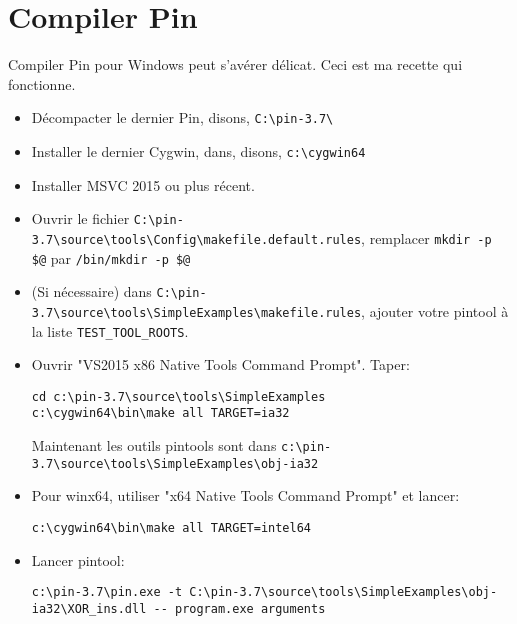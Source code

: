 \section{Compiler Pin}

Compiler Pin pour Windows peut s'avérer délicat.
Ceci est ma recette qui fonctionne.

\begin{itemize}

\item Décompacter le dernier Pin, disons, \verb|C:\pin-3.7\|

\item Installer le dernier Cygwin, dans, disons, \verb|c:\cygwin64|

\item Installer MSVC 2015 ou plus récent.

\item Ouvrir le fichier \verb|C:\pin-3.7\source\tools\Config\makefile.default.rules|, remplacer \verb|mkdir -p $@| par \verb|/bin/mkdir -p $@|

\item (Si nécessaire) dans \verb|C:\pin-3.7\source\tools\SimpleExamples\makefile.rules|, ajouter votre pintool à la liste \verb|TEST_TOOL_ROOTS|.

\item Ouvrir "VS2015 x86 Native Tools Command Prompt". Taper:

\begin{lstlisting}
cd c:\pin-3.7\source\tools\SimpleExamples
c:\cygwin64\bin\make all TARGET=ia32
\end{lstlisting}

Maintenant les outils pintools sont dans \verb|c:\pin-3.7\source\tools\SimpleExamples\obj-ia32|

\item Pour winx64, utiliser "x64 Native Tools Command Prompt" et lancer:

\begin{lstlisting}
c:\cygwin64\bin\make all TARGET=intel64
\end{lstlisting}

\item Lancer pintool:

\begin{lstlisting}
c:\pin-3.7\pin.exe -t C:\pin-3.7\source\tools\SimpleExamples\obj-ia32\XOR_ins.dll -- program.exe arguments
\end{lstlisting}

\end{itemize}
